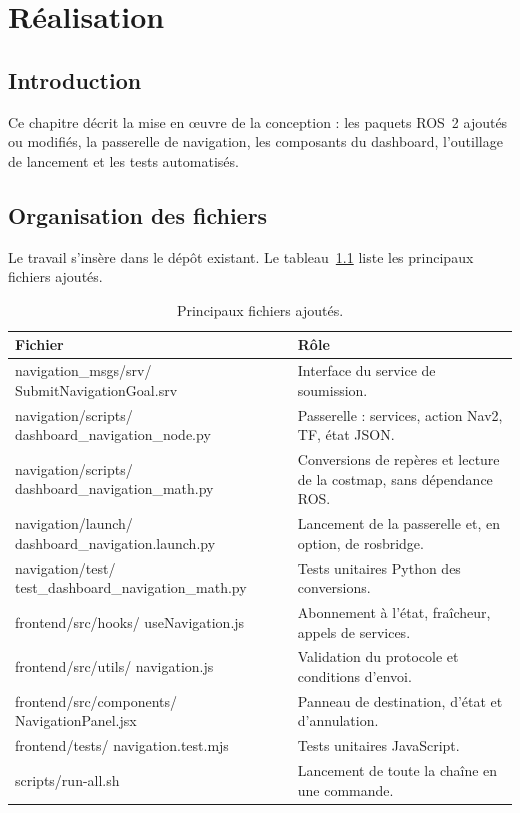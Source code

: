 \chapter{Réalisation}

\section*{Introduction}
Ce chapitre décrit la mise en œuvre de la conception : les paquets ROS~2 ajoutés ou
modifiés, la passerelle de navigation, les composants du dashboard, l'outillage de
lancement et les tests automatisés.

\section{Organisation des fichiers}
Le travail s'insère dans le dépôt existant. Le tableau~\ref{tab:fichiers} liste les
principaux fichiers ajoutés.

\begin{table}[!htb]
\centering\footnotesize
\begin{tabularx}{\linewidth}{@{}>{\ttfamily\raggedright\arraybackslash}p{7.4cm}X@{}}
\toprule
\normalfont\textbf{Fichier} & \textbf{Rôle} \\
\midrule
navigation\_msgs/srv/ SubmitNavigationGoal.srv & Interface du service de soumission. \\
navigation/scripts/ dashboard\_navigation\_node.py & Passerelle : services, action Nav2, TF, état JSON. \\
navigation/scripts/ dashboard\_navigation\_math.py & Conversions de repères et lecture de la costmap, sans dépendance ROS. \\
navigation/launch/ dashboard\_navigation.launch.py & Lancement de la passerelle et, en option, de rosbridge. \\
navigation/test/ test\_dashboard\_navigation\_math.py & Tests unitaires Python des conversions. \\
frontend/src/hooks/ useNavigation.js & Abonnement à l'état, fraîcheur, appels de services. \\
frontend/src/utils/ navigation.js & Validation du protocole et conditions d'envoi. \\
frontend/src/components/ NavigationPanel.jsx & Panneau de destination, d'état et d'annulation. \\
frontend/tests/ navigation.test.mjs & Tests unitaires JavaScript. \\
scripts/run-all.sh & Lancement de toute la chaîne en une commande. \\
\bottomrule
\end{tabularx}
\caption{Principaux fichiers ajoutés.}
\label{tab:fichiers}
\end{table}

